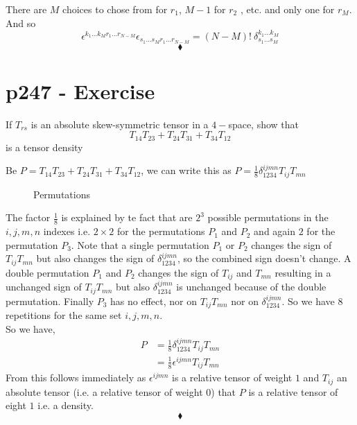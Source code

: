 There are $M$ choices to chose from for $r_1$, $M-1$ for $r_2$ , etc. and only one for $r_M$. And so $$\epsilon^{k_1\dots k_M r_1\dots r_{N-M}}\epsilon_{s_1\dots s_M r_1\dots r_{N-M}}= \left(N-M\right)!\ \delta^{k_1\dots k_M}_{s_1\dots s_M}$$
$$\blacklozenge$$
\newpage




\section{p247 - Exercise }
\begin{tcolorbox}
If $T_{rs}$  is an absolute skew-symmetric tensor in a $4-$space, show that $$T_{14}T_{23}+T_{24}T_{31}+T_{34}T_{12}$$ is a tensor density
\end{tcolorbox}
Be $P= T_{14}T_{23}+T_{24}T_{31}+T_{34}T_{12}$, we can write this as $P= \frac{1}{8}\delta^{ijmn}_{1234}T_{ij}T_{mn}$ 
\begin{figure}[H]%
    \centering
    \subfloat[]{}
\caption{Permutations}
\label{fig:fig_p247}
\end{figure}
The factor $\frac{1}{8}$ is explained by te fact that are $2^3$ possible permutations in the $i,j,m,n$ indexes i.e. $2\times2$ for the permutations $P_1$ and $P_2$ and again $2$ for the permutation $P_3$. Note that a single permutation $P_1$ or $P_2$ changes the sign of  $T_{ij}T_{mn}$ but also changes the sign of $\delta^{ijmn}_{1234}$, so the combined sign doesn't change. A double permutation $P_1$ and  $P_2$ changes the sign of  $T_{ij}$ and $T_{mn}$ resulting in a unchanged sign of  $T_{ij}T_{mn}$ but also $\delta^{ijmn}_{1234}$ is unchanged because of the double permutation. Finally $P_3$ has no effect, nor on $T_{ij}T_{mn}$ nor on $\delta^{ijmn}_{1234}$. So we have 8 repetitions for  the same set $i,j,m,n$.\\
So we have, 
\begin{align}
P&= \frac{1}{8}\delta^{ijmn}_{1234}T_{ij}T_{mn}\\
&= \frac{1}{8}\epsilon^{ijmn}T_{ij}T_{mn}
\end{align}
From this follows immediately as $\epsilon^{ijmn}$ is a relative tensor of weight $1$ and $T_{ij}$ an absolute tensor (i.e. a relative tensor of weight $0$) that $P$ is a relative tensor of eight $1$ i.e. a density.
$$\blacklozenge$$
\newpage



